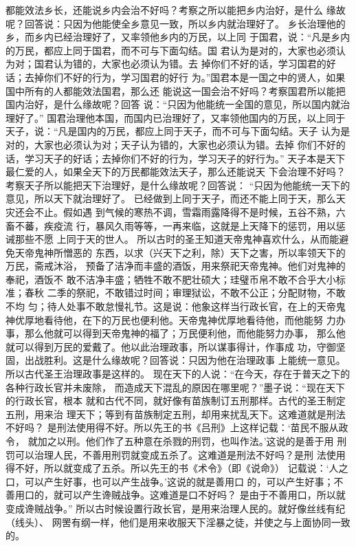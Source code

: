 \documentclass[12pt,UTF8]{ctexbook}
\begin{document}
都能效法乡长，还能说乡内会治不好吗？考察之所以能把乡内治好，是什么 
缘故呢？回答说：只因为他能使全乡意见一致，所以乡内就治理好了。 
乡长治理他的乡，而乡内已经治理好了，又率领他乡内的万民，以上同 
于国君，说：“凡是乡内的万民，都应上同于国君，而不可与下面勾结。国 
君认为是对的，大家也必须认为对；国君认为错的，大家也必须认为错。去 
掉你们不好的话，学习国君的好话；去掉你们不好的行为，学习国君的好行 
为。”国君本是一国之中的贤人，如果国中所有的人都能效法国君，那么还 
能说这一国会治不好吗？考察国君所以能把国内治好，是什么缘故呢？回答 
说：“只因为他能统一全国的意见，所以国内就治理好了。” 
国君治理他本国，而国内已治理好了，又率领他国内的万民，以上同于 
天子，说：“凡是国内的万民，都应上同于天子，而不可与下面勾结。天子 
认为是对的，大家也必须认为对；天子认为错的，大家也必须认为错。去掉 
你们不好的话，学习天子的好话；去掉你们不好的行为，学习天子的好行为。” 
天子本是天下最仁爱的人，如果全天下的万民都能效法天子，那么还能说天 
下会治理不好吗？考察天子所以能把天下治理好，是什么缘故呢？回答说： 
“只因为他能统一天下的意见，所以天下就治理好了。 
已经做到上同于天子，而还不能上同于天，那么天灾还会不止。假如遇 
到气候的寒热不调，雪霜雨露降得不是时候，五谷不熟，六畜不蕃，疾疫流 
行，暴风久雨等等，一再来临，这就是上天降下的惩罚，用以惩诫那些不愿 
上同于天的世人。 
所以古时的圣王知道天帝鬼神喜欢什么，从而能避免天帝鬼神所憎恶的 
东西，以求（兴天下之利，除）天下之害，所以率领天下的万民，斋戒沐浴， 
预备了洁净而丰盛的酒饭，用来祭祀天帝鬼神。他们对鬼神的奉祀，酒饭不 
敢不洁净丰盛；牺牲不敢不肥壮硕大；珪璧币帛不敢不合乎大小标准；春秋 
二季的祭祀，不敢错过时间；审理狱讼，不敢不公正；分配财物，不敢不均 
匀；待人处事不敢怠慢礼节。这是说：他象这样当行政长官，在上的天帝鬼 
神优厚地看待他，在下的万民也便利他。天帝鬼神优厚地看待他，而他能努 
力办事，那么他就可以得到天帝鬼神的福了；万民便利他，而他能努力办事， 
那么他就可以得到万民的爱戴了。他以此治理政事，所以谋事得计，作事成 
功，守御坚固，出战胜利。这是什么缘故呢？回答说：只因为他在治理政事 
上能统一意见。所以古代圣王治理政事是这样的。 
现在天下的人说：“在今天，存在于普天之下的各种行政长官并未废除， 
而造成天下混乱的原因在哪里呢？”墨子说：“现在天下的行政长官，根本 
就和古代不同，就好像有苗族制订五刑那样。古代的圣王制定五刑，用来治 
理天下；等到有苗族制定五刑，却用来扰乱天下。这难道就是刑法不好吗？ 
是刑法使用得不好。所以先王的书《吕刑》上这样记载：‘苗民不服从政令， 
就加之以刑。他们作了五种意在杀戮的刑罚，也叫作法。’这说的是善于用 
刑罚可以治理人民，不善用刑罚就变成五杀了。这难道是刑法不好吗？是刑 
法使用得不好，所以就变成了五杀。所以先王的书《术令》（即《说命》） 
记载说：‘人之口，可以产生好事，也可以产生战争。’这说的就是善用口 
的，可以产生好事；不善用口的，就可以产生谗贼战争。这难道是口不好吗？ 
是由于不善用口，所以就变成谗贼战争。” 
所以古时候设置行政长官，是用来治理人民的。就好像丝线有纪（线头）、 
网罟有纲一样，他们是用来收服天下淫暴之徒，并使之与上面协同一致的。 
\end{document}
